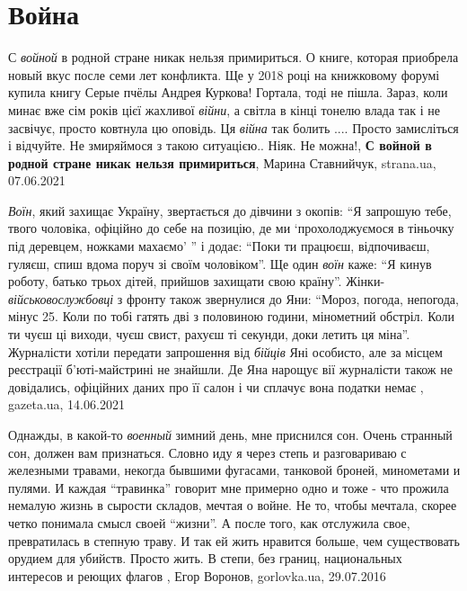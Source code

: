  
 
 
 
 
\chapter{Война}
\label{sec:slova.vojna}

С \emph{войной} в родной стране никак нельзя примириться. О книге, которая
приобрела новый вкус после семи лет конфликта. Ще у 2018 році на книжковому
форумі купила книгу Серые пчёлы Андрея Куркова!  Гортала, тоді не пішла. Зараз,
коли минає вже сім років цієї жахливої \emph{війни}, а світла в кінці тонелю
влада так і не засвічує, просто ковтнула цю оповідь.  Ця \emph{війна} так
болить ....  Просто замисліться і відчуйте. Не змиряймося з такою ситуацією..
Ніяк. Не можна!,
\textbf{С войной в родной стране никак нельзя примириться},
Марина Ставнийчук, strana.ua, 07.06.2021

\emph{Воїн}, який захищає Україну, звертається до дівчини з окопів: \enquote{Я
запрошую тебе, твого чоловіка, офіційно до себе на позицію, де ми
\enquote{прохолоджуємося в тіньочку під деревцем, ножками махаємо} } і додає:
\enquote{Поки ти працюєш, відпочиваєш, гуляєш, спиш вдома поруч зі своїм
чоловіком}.  Ще один \emph{воїн} каже: \enquote{Я кинув роботу, батько трьох
дітей, прийшов захищати свою країну}. Жінки-\emph{військовослужбовці} з фронту
також звернулися до Яни: \enquote{Мороз, погода, непогода, мінус 25. Коли по
тобі гатять дві з половиною години, мінометний обстріл. Коли ти чуєш ці виходи,
чуєш свист, рахуєш ті секунди, доки летить ця міна}. Журналісти хотіли
передати запрошення від \emph{бійців} Яні особисто, але за місцем реєстрації
б'юті-майстрині не знайшли. Де Яна нарощує вії журналісти також не довідались,
офіційних даних про її салон і чи сплачує вона податки немає
, 
gazeta.ua, 14.06.2021

Однажды, в какой-то \emph{военный} зимний день, мне приснился сон. Очень странный сон,
должен вам признаться. Словно иду я через степь и разговариваю с железными
травами, некогда бывшими фугасами, танковой броней, минометами и пулями. И
каждая \enquote{травинка} говорит мне примерно одно и тоже - что прожила немалую жизнь
в сырости складов, мечтая о войне. Не то, чтобы мечтала, скорее четко понимала
смысл своей \enquote{жизни}. А после того, как отслужила свое, превратилась в степную
траву. И так ей жить нравится больше, чем существовать орудием для убийств.
Просто жить. В степи, без границ, национальных интересов и реющих флагов
, 
Егор Воронов, gorlovka.ua, 29.07.2016

